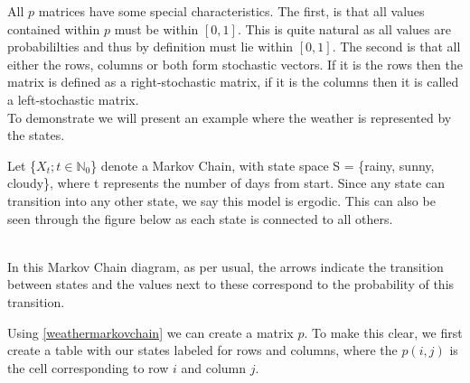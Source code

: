 All $p$ matrices have some special characteristics. The first, is that all values contained within $p$ must be within $[0,1]$. This is quite natural as all values are probabililties and thus by definition must lie within $[0,1]$. The second is that all either the rows, columns or both form stochastic vectors. If it is the rows then the matrix is defined as a right-stochastic matrix, if it is the columns then it is called a left-stochastic matrix.\\

To demonstrate we will present an example where the weather is represented by the states.  

\begin{example}
\label{weathermarkovchain}
	Let \{$X_t ; t \in \mathbb{N}_0$\} denote a Markov Chain, with state space S = \{rainy, sunny, cloudy\}, where t represents the number of days from start. Since any state can transition into any other state, we say this model is ergodic. This can also be seen through the figure below as each state is connected to all others. 
	
	\begin{center}
	\\
    In this Markov Chain diagram, as per usual, the arrows indicate the transition between states and the values next to these correspond to the probability of this transition. 
	\end{center}
\end{example}

Using \ref{weathermarkovchain} we can create a matrix $p$. To make this clear, we first create a table with our states labeled for rows and columns, where the $p(i,j)$ is the cell corresponding to row $i$ and column $j$.

